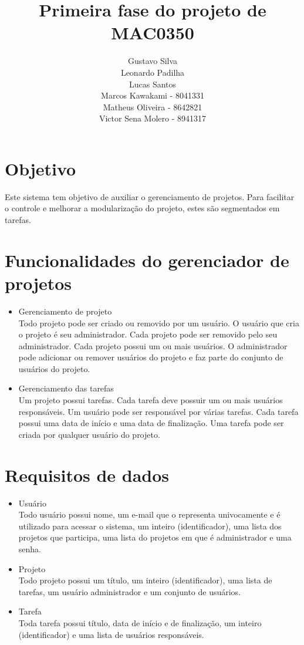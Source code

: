 \documentclass{article}
\title{Primeira fase do projeto de MAC0350}
\author{Gustavo Silva \\Leonardo Padilha \\Lucas Santos \\Marcos Kawakami - 8041331 \\Matheus Oliveira - 8642821 \\Victor Sena Molero - 8941317}
\date{}
\begin{document}
\maketitle

\section{Objetivo}
Este sistema tem objetivo de auxiliar o gerenciamento de projetos. Para facilitar o controle e melhorar a modularização do projeto, estes são segmentados em tarefas.

\section{Funcionalidades do gerenciador de projetos}
\begin{itemize}
    \item Gerenciamento de projeto
    \\Todo projeto pode ser criado ou removido por um usuário. O usuário que cria o projeto é seu administrador. Cada projeto pode ser removido pelo seu administrador. Cada projeto possui um ou mais usuários. O administrador pode adicionar ou remover usuários do projeto e faz parte do conjunto de usuários do projeto.
    \item Gerenciamento das tarefas
    \\Um projeto possui tarefas. Cada tarefa deve possuir um ou mais usuários responsáveis. Um usuário pode ser responsável por várias tarefas. Cada tarefa possui uma data de início e uma data de finalização. Uma tarefa pode ser criada por qualquer usuário do projeto.
\end{itemize}

\section{Requisitos de dados}
\begin{itemize}
    \item Usuário
    \\ Todo usuário possui nome, um e-mail que o representa univocamente e é utilizado para acessar o sistema, um inteiro (identificador), uma lista dos projetos que participa, uma lista do projetos em que é administrador e uma senha.
    \item Projeto
    \\Todo projeto possui um título, um inteiro (identificador), uma lista de tarefas, um usuário administrador e um conjunto de usuários.
    \item Tarefa
    \\Toda tarefa possui título, data de início e de finalização, um inteiro (identificador) e uma lista de usuários responsáveis.
\end{itemize}
\end{document}
